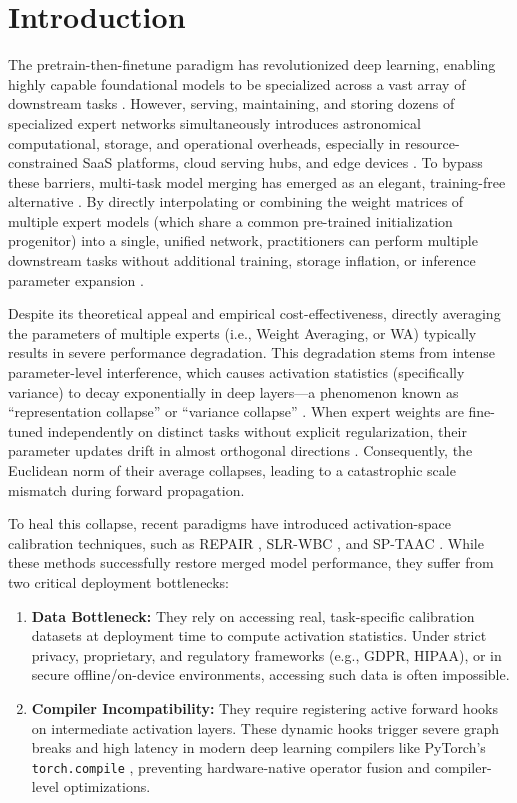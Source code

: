 \documentclass{article}
\theoremstyle{plain}
\theoremstyle{definition}
\theoremstyle{remark}
\begin{document}
\section{Introduction}
\label{sec:intro}

The pretrain-then-finetune paradigm has revolutionized deep learning, enabling highly capable foundational models to be specialized across a vast array of downstream tasks \cite{he16, vaswani17, devlin19, brown20}. However, serving, maintaining, and storing dozens of specialized expert networks simultaneously introduces astronomical computational, storage, and operational overheads, especially in resource-constrained SaaS platforms, cloud serving hubs, and edge devices \cite{liang22}. To bypass these barriers, multi-task model merging has emerged as an elegant, training-free alternative \cite{wortsman22, xu24}. By directly interpolating or combining the weight matrices of multiple expert models (which share a common pre-trained initialization progenitor) into a single, unified network, practitioners can perform multiple downstream tasks without additional training, storage inflation, or inference parameter expansion \cite{ilharco23, jin23, tang23}.

Despite its theoretical appeal and empirical cost-effectiveness, directly averaging the parameters of multiple experts (i.e., Weight Averaging, or WA) typically results in severe performance degradation. This degradation stems from intense parameter-level interference, which causes activation statistics (specifically variance) to decay exponentially in deep layers---a phenomenon known as ``representation collapse'' or ``variance collapse'' \cite{jordan23, yadav24slr}. When expert weights are fine-tuned independently on distinct tasks without explicit regularization, their parameter updates drift in almost orthogonal directions \cite{choshen22, jin23regmean}. Consequently, the Euclidean norm of their average collapses, leading to a catastrophic scale mismatch during forward propagation.

To heal this collapse, recent paradigms have introduced activation-space calibration techniques, such as REPAIR \cite{jordan23}, SLR-WBC \cite{yadav24slr}, and SP-TAAC \cite{sptaac24}. While these methods successfully restore merged model performance, they suffer from two critical deployment bottlenecks:
\begin{enumerate}
  \item \textbf{Data Bottleneck:} They rely on accessing real, task-specific calibration datasets at deployment time to compute activation statistics. Under strict privacy, proprietary, and regulatory frameworks (e.g., GDPR, HIPAA), or in secure offline/on-device environments, accessing such data is often impossible.
  \item \textbf{Compiler Incompatibility:} They require registering active forward hooks on intermediate activation layers. These dynamic hooks trigger severe graph breaks and high latency in modern deep learning compilers like PyTorch's \texttt{torch.compile} \cite{paszke19}, preventing hardware-native operator fusion and compiler-level optimizations.
\end{enumerate}
\end{document}
